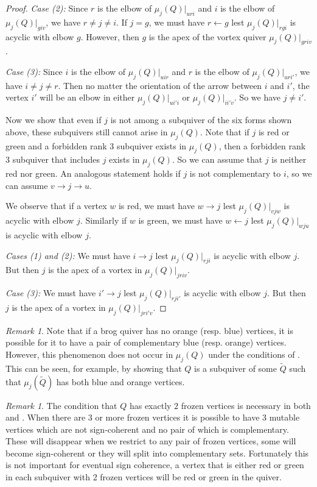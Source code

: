 \documentclass[12pt]{amsart}
\theoremstyle{definition}
\theoremstyle{remark}
\newtheorem{rem}[thm]{Remark}
\numberwithin{equation}{section}
\begin{document}
\begin{proof}
\emph{Case (2):}  Since $r$ is the elbow of $\mu_j(Q)|_{uri}$ and $i$ is the elbow of $\mu_j(Q)|_{giv}$, we have $r \neq j \neq i$.  If $j = g$, we must have $r \leftarrow g$ lest $\mu_j(Q)|_{rgi}$ is acyclic with elbow $g$.  However, then $g$ is the apex of the vortex quiver $\mu_j(Q)|_{griv}$.

\emph{Case (3):} Since $i$ is the elbow of $\mu_j(Q)|_{uir}$ and $r$ is the elbow of $\mu_j(Q)|_{uri'}$, we have $i \neq j \neq r$.  Then no matter the orientation of the arrow between $i$ and $i'$, the vertex $i'$ will be an elbow in either $\mu_j(Q)|_{ui'i}$ or $\mu_j(Q)|_{ii'v}$.  So we have $j \neq i'$.

Now we show that even if $j$ is not among a subquiver of the six forms shown above, these subquivers still cannot arise in $\mu_j(Q)$.  Note that if $j$ is red or green and a forbidden rank $3$ subquiver exists in $\mu_j(Q)$, then a forbidden rank $3$ subquiver that includes $j$ exists in $\mu_j(Q)$.  So we can assume that $j$ is neither red nor green.  An analogous statement holds if $j$ is not complementary to $i$, so we can assume $v \rightarrow j \rightarrow u$.

We observe that if a vertex $w$ is red, we must have $w \rightarrow j$ lest $\mu_j(Q)|_{vjw}$ is acyclic with elbow $j$.  Similarly if $w$ is green, we must have $w \leftarrow j$ lest $\mu_j(Q)|_{wju}$ is acyclic with elbow $j$.  

\emph{Cases (1) and (2):} We must have $i \rightarrow j$ lest $\mu_j(Q)|_{rji}$ is acyclic with elbow $j$.   But then $j$ is the apex of a vortex in $\mu_j(Q)|_{jriv}$.


\emph{Case (3):} We must have $i' \rightarrow j$ lest $\mu_j(Q)|_{rji'}$ is acyclic with elbow $j$.  But then $j$ is the apex of a vortex in $\mu_j(Q)|_{jri'v}$.\end{proof}

\begin{rem}
Note that if a brog quiver has no orange (resp. blue) vertices, it is possible for it to have a pair of complementary blue (resp. orange) vertices.  However, this phenomenon does not occur in $\mu_j(Q)$ under the conditions of .  This can be seen, for example, by showing that $Q$ is a subquiver of some $\widetilde Q$ such that $\mu_j(\widetilde Q)$ has both blue and orange vertices.
\end{rem}

\begin{rem}
The condition that $Q$ has exactly $2$ frozen vertices is necessary in both  and . 
When there are $3$ or more frozen vertices it is possible to have $3$ mutable vertices which are not sign-coherent and no pair of which is complementary. These will disappear when we restrict to any pair of frozen vertices, some will become sign-coherent or they will split into complementary sets.  Fortunately this is not important for eventual sign coherence, a vertex that is either red or green in each subquiver with 2 frozen vertices will be red or green in the quiver. %
\end{rem}
\end{document}
